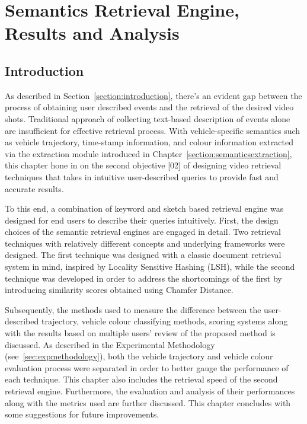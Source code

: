 
\chapter{Semantics Retrieval Engine, Results and Analysis}

\label{section:retrievalengine}
\section{Introduction}

As described in Section~\ref{section:introduction}, there's an evident gap
between the process of obtaining user described events and the retrieval of the
desired video shots. Traditional approach of collecting text-based description
of events alone are insufficient for effective retrieval process.
With vehicle-specific semantics such as vehicle trajectory, time-stamp
information, and colour information extracted via the extraction module
introduced in Chapter~\ref{section:semanticsextraction},
this chapter hone in on the second objective [02] of designing video retrieval
techniques that takes in intuitive user-described queries to provide fast
and accurate results.

To this end, a combination of keyword and sketch based retrieval engine was
designed for end users to describe their queries intuitively.
First, the design choices of the semantic retrieval engines are engaged in
detail. Two retrieval techniques with relatively different concepts and
underlying frameworks were designed.
The first technique was designed with a classic document retrieval system in
mind, inspired by Locality Sensitive Hashing (LSH), while the second technique
was developed in order to address the shortcomings of the first by introducing
similarity scores obtained using Chamfer Distance.

Subsequently, the methods used to measure the difference between the
user-described trajectory, vehicle colour classifying methods, scoring systems
along with the results based on multiple users' review of the proposed method
is discussed.
As described in the Experimental Methodology (see~\ref{sec:expmethodology}),
both the vehicle trajectory and vehicle colour evaluation process were
separated in order to better gauge the performance of each technique.
This chapter also includes the retrieval speed of the second retrieval engine.
Furthermore, the evaluation and analysis of their performances along with the
metrics used are further discussed. This chapter concludes with some
suggestions for future improvements.

